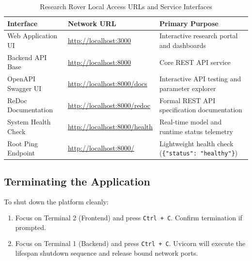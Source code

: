 \begin{table}[H]
\centering
\caption{Research Rover Local Access URLs and Service Interfaces}
\label{tab:access_urls}
\begin{tabularx}{\textwidth}{l X l}
\toprule
\textbf{Interface} & \textbf{Network URL} & \textbf{Primary Purpose} \\
\midrule
Web Application UI & \url{http://localhost:3000} & Interactive research portal and dashboards \\
Backend API Base & \url{http://localhost:8000} & Core REST API service \\
OpenAPI Swagger UI & \url{http://localhost:8000/docs} & Interactive API testing and parameter explorer \\
ReDoc Documentation & \url{http://localhost:8000/redoc} & Formal REST API specification documentation \\
System Health Check & \url{http://localhost:8000/health} & Real-time model and runtime status telemetry \\
Root Ping Endpoint & \url{http://localhost:8000/} & Lightweight health check (\texttt{\{"status": "healthy"\}}) \\
\bottomrule
\end{tabularx}
\end{table}

\subsection{Terminating the Application}
To shut down the platform cleanly:
\begin{enumerate}
    \item Focus on Terminal 2 (Frontend) and press \texttt{Ctrl + C}. Confirm termination if prompted.
    \item Focus on Terminal 1 (Backend) and press \texttt{Ctrl + C}. Uvicorn will execute the lifespan shutdown sequence and release bound network ports.
\end{enumerate}
